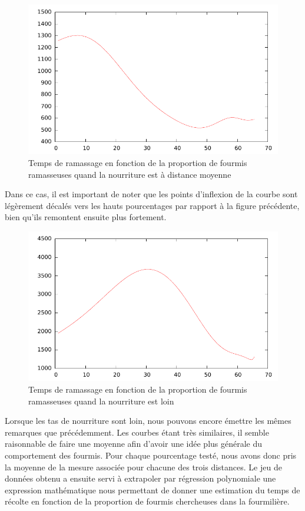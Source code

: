 \documentclass{article}
\begin{document}
\begin{figure}[H]
\centering
\includegraphics[scale=0.6]{middle.pdf}
\caption{Temps de ramassage en fonction de la proportion de fourmis ramasseuses quand la nourriture est à distance moyenne}
\label{fig:moyen}
\end{figure}

Dans ce cas, il est important de noter que les points d'inflexion de la courbe sont légèrement décalés vers les hauts pourcentages par rapport à la figure précédente, bien qu'ils remontent ensuite plus fortement.

\begin{figure}[H]
\centering
\includegraphics[scale=0.6]{far.pdf}
\caption{Temps de ramassage en fonction de la proportion de fourmis ramasseuses quand la nourriture est loin}
\label{fig:loin}
\end{figure}

Lorsque les tas de nourriture sont loin, nous pouvons encore émettre les mêmes remarques que précédemment. Les courbes étant très similaires, il semble raisonnable de faire une moyenne afin d'avoir une idée plus générale du comportement des fourmis. Pour chaque pourcentage testé, nous avons donc pris la moyenne de la mesure associée pour chacune des trois distances. Le jeu de données obtenu a ensuite servi à extrapoler par régression polynomiale une expression mathématique nous permettant de donner une estimation du temps de récolte en fonction de la proportion de fourmis chercheuses dans la fourmilière. 
\end{document}
